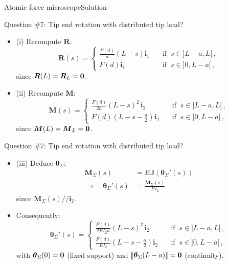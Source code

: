 \documentclass{beamer}
\newcommand{\imply}{\Rightarrow}
\renewcommand{\ij}{i}
\newcommand{\iv}{{\boldsymbol\ij}}
\newcommand*{\drotj}{\theta}
\newcommand*{\drot}{{\boldsymbol\drotj}}
\newcommand*{\Mstaticj}{J}
\newcommand*{\Mstatic}{{\mathbb\Mstaticj}}
\newcommand{\Fresj}{R}
\newcommand{\Mresj}{M}
\newcommand{\Fres}{{\boldsymbol\Fresj}}
\newcommand{\Mres}{{\boldsymbol\Mresj}}
\newcommand{\bzero}{{\bf 0}}
\newcommand{\jump}[1]{\llbracket{#1}\rrbracket}
\begin{document}
\begin{frame}{Atomic force microscope}{Solution}
\begin{overprint}
\vskip-20pt
\begin{exampleblock}{Question \#7: Tip end rotation with distributed tip load?}
\begin{itemize}
\item (i) Recompute $\Fres$:
\begin{displaymath}
\Fres(s)=\left\{\begin{array}{cl}
\frac{F(d)}{a}(L-s)\iv_1 & \quad\text{if}\;\;s\in]L-a,L[\,, \\
F(d)\iv_1 & \quad\text{if}\;\;s\in]0,L-a[\,,
\end{array}\right.
\end{displaymath}
since $\Fres(L)=\Fres_L=\bzero$.
\item (ii) Recompute $\Mres$:
\begin{displaymath}
\Mres(s)=\left\{\begin{array}{cl}
\frac{F(d)}{2a}(L-s)^2\,\iv_2 & \quad\text{if}\;\;s\in]L-a,L[\,, \\
F(d)\left(L-s-\frac{a}{2}\right)\iv_2 & \quad\text{if}\;\;s\in]0,L-a[\,,
\end{array}\right.
\end{displaymath}
since $\Mres(L)=\Mres_L=\bzero$.
\end{itemize}
\end{exampleblock}

\vskip-20pt
\begin{exampleblock}{Question \#7: Tip end rotation with distributed tip load?}
\begin{itemize}
\item (iii) Deduce $\drot_\Sigma$:
\begin{displaymath}
\begin{split}
\Mres_\Sigma(s) &= E\Mstatic(\drot_\Sigma'(s)) \\
\imply\quad \drot_\Sigma'(s) &=\frac{\Mres_\Sigma(s)}{EI_2}
\end{split}
\end{displaymath}
since $\Mres_\Sigma(s)//\iv_2$.
\item Consequently:
\begin{displaymath}
\drot_\Sigma'(s)=\left\{\begin{array}{cl}
\frac{F(d)}{2EI_2a}(L-s)^2\,\iv_2 & \quad\text{if}\;\;s\in]L-a,L[\,, \\
\frac{F(d)}{EI_2}\left(L-s-\frac{a}{2}\right)\iv_2 & \quad\text{if}\;\;s\in]0,L-a[\,,
\end{array}\right.
\end{displaymath}
with $\drot_\Sigma(0)=\bzero$ (fixed support) and $\jump{\drot_\Sigma(L-a)}=\bzero$ (continuity).
\end{itemize}
\end{exampleblock}


\end{overprint}
\end{frame}
\end{document}
